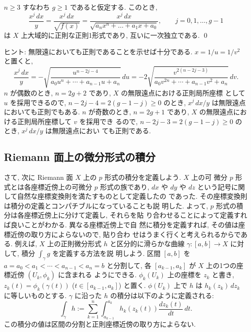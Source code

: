 \documentclass[12pt,twoside]{jarticle}
\def\od#1#2{\frac{d #1}{d #2}}
\begin{document}
\begin{question}
  $n\ge3$ すなわち $g\ge1$ であると仮定する. このとき, 
  \[
    \frac{x^j\,dx}{y}
    = \frac{x^j\,dx}{\sqrt{f(x)}}
    = \frac{x^j\,dx}{\sqrt{a_n x^n + \dots + a_1x+a_0}},
    \qquad
    j=0,1,\dots,g-1
  \] %
  は $X$ 上大域的に正則な正則1形式であり, 互いに一次独立である. \qed
\end{question}

\noindent ヒント: 無限遠においても正則であることを示せば十分である. %
$x=1/u=1/v^2$ と置くと,
\[
  \frac{x^j\,dx}{y}
  = - \sqrt{\frac{u^{n-2j-4}}{a_0u^n+\cdots+a_{n-1}u+a_n}}\,du
  = -2 \sqrt{\frac{v^{2(n-2j-3)}}{a_0v^{2n}+\cdots+a_{n-1}v^2+a_n}}\,dv.
\] %
$n$ が偶数のとき, $n=2g+2$ であり, $X$ の無限遠点における正則局所座標
として $u$ を採用できるので, $n-2j-4=2(g-1-j)\ge0$ のとき, %
$x^j\,dx/y$ は無限遠点においても正則でもある. $n$ が奇数のとき, %
$n=2g+1$ であり, $X$ の無限遠点における正則局所座標して $v$ を採用でき
るので, $n-2j-3=2(g-1-j)\ge0$ のとき, $x^j\,dx/y$ は無限遠点におい
ても正則である.


\subsection{Riemann 面上の微分形式の積分}

さて, 次に Riemann 面 $X$ 上の $p$ 形式の積分を定義しよう. $X$ 上の可
微分 $p$ 形式とは各座標近傍上の可微分 $p$ 形式の族であり, $dx$ や $dy$
や $dz$ という記号に関して自然な座標変換則を満たすものとして定義したの
であった. その座標変換則は積分の定義とコンパチブルになっていることも説
明した. よって, $p$ 形式の積分は各座標近傍上に分けて定義し, それらを貼
り合わせることによって定義すれば良いことがわかる. 異なる座標近傍上で自
然に積分を定義すれば, その値は座標近傍の取り方によらないので, 貼り合わ
せはうまく行くと考えられるからである. 
例えば, $X$ 上の正則微分形式 $h$ と区分的に滑らかな曲線 %
$\gamma:[a,b]\to X$ に対して, 積分 $\int_\gamma g$ を定義する方法を説
明しよう. 区間 $[a,b]$ を $a=a_0<a_1<\cdots<a_{n-1}<a_n=b$ と分割して,
各 $[a_{k-1},a_k]$ が $X$ 上の1つの座標近傍 $(U_k,\phi_k)$ に含まれる
ようにできる. $\phi_k(U_k)$ 上の座標を $z_k$ と書き, %
$z_k(t)=\phi_k(\gamma(t))$ ($t\in[a_{k-1},a_k]$) と置く. %
$\phi(U_k)$ 上で $h$ は $h_k(z_k)\,dz_k$ に等しいものとする. %
$\gamma$ に沿った $h$ の積分は以下のように定義される:
\[
  \int_\gamma h :=
  \sum_{k=1}^n \int_{a_{k-1}}^{a_k} h_k(z_k(t))\od{z_k(t)}{t}\,dt.
\]
この積分の値は区間の分割と正則座標近傍の取り方によらない.
\end{document}
